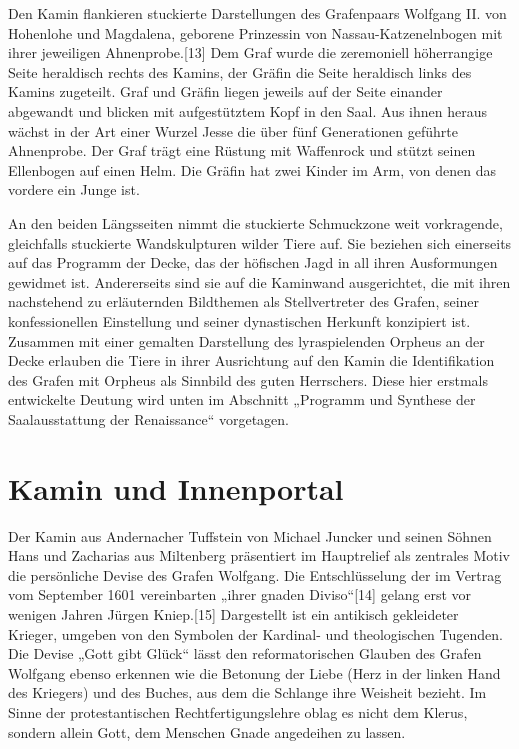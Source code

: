\documentclass[
  a4paper,
  openany]{book}
\begin{document}
Den Kamin flankieren stuckierte Darstellungen des Grafenpaars Wolfgang
II. von Hohenlohe und Magdalena, geborene Prinzessin von
Nassau-Katzenelnbogen mit ihrer jeweiligen Ahnenprobe.{[}13{]} Dem Graf
wurde die zeremoniell höherrangige Seite heraldisch rechts des Kamins,
der Gräfin die Seite heraldisch links des Kamins zugeteilt. Graf und
Gräfin liegen jeweils auf der Seite einander abgewandt und blicken mit
aufgestütztem Kopf in den Saal. Aus ihnen heraus wächst in der Art einer
Wurzel Jesse die über fünf Generationen geführte Ahnenprobe. Der Graf
trägt eine Rüstung mit Waffenrock und stützt seinen Ellenbogen auf einen
Helm. Die Gräfin hat zwei Kinder im Arm, von denen das vordere ein Junge
ist.

An den beiden Längsseiten nimmt die stuckierte Schmuckzone weit
vorkragende, gleichfalls stuckierte Wandskulpturen wilder Tiere auf. Sie
beziehen sich einerseits auf das Programm der Decke, das der höfischen
Jagd in all ihren Ausformungen gewidmet ist. Andererseits sind sie auf
die Kaminwand ausgerichtet, die mit ihren nachstehend zu erläuternden
Bildthemen als Stellvertreter des Grafen, seiner konfessionellen
Einstellung und seiner dynastischen Herkunft konzipiert ist. Zusammen
mit einer gemalten Darstellung des lyraspielenden Orpheus an der Decke
erlauben die Tiere in ihrer Ausrichtung auf den Kamin die Identifikation
des Grafen mit Orpheus als Sinnbild des guten Herrschers. Diese hier
erstmals entwickelte Deutung wird unten im Abschnitt „Programm und
Synthese der Saalausstattung der Renaissance`` vorgetagen.

\section{Kamin und Innenportal}\label{kamin-und-innenportal}

Der Kamin aus Andernacher Tuffstein von Michael Juncker und seinen
Söhnen Hans und Zacharias aus Miltenberg präsentiert im Hauptrelief als
zentrales Motiv die persönliche Devise des Grafen Wolfgang. Die
Entschlüsselung der im Vertrag vom September 1601 vereinbarten „ihrer
gnaden Diviso``{[}14{]} gelang erst vor wenigen Jahren Jürgen
Kniep.{[}15{]} Dargestellt ist ein antikisch gekleideter Krieger,
umgeben von den Symbolen der Kardinal- und theologischen Tugenden. Die
Devise „Gott gibt Glück`` lässt den reformatorischen Glauben des Grafen
Wolfgang ebenso erkennen wie die Betonung der Liebe (Herz in der linken
Hand des Kriegers) und des Buches, aus dem die Schlange ihre Weisheit
bezieht. Im Sinne der protestantischen Rechtfertigungslehre oblag es
nicht dem Klerus, sondern allein Gott, dem Menschen Gnade angedeihen zu
lassen.
\end{document}
